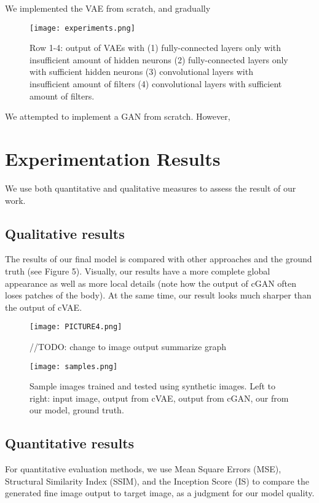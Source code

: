 \documentclass[10pt,conference]{IEEEtran}
\begin{document}
We implemented the VAE from scratch, and gradually 

\begin{figure}[htbp]
\centering
\texttt{[image: experiments.png]}
\caption{Row 1-4: output of VAEs with (1) fully-connected layers only with insufficient amount of  hidden neurons (2) fully-connected layers only with sufficient hidden neurons (3) convolutional layers with insufficient amount of filters (4) convolutional layers with sufficient amount of filters. }
\end{figure}

We attempted to implement a GAN from scratch. However, 

\section{Experimentation Results}

We use both quantitative and qualitative measures to assess the result of our work.

\subsection{Qualitative results}

The results of our final model is compared with other approaches and the ground truth (see Figure 5). Visually, our results have a more complete global appearance as well as more local details (note how the output of cGAN often loses patches of the body). At the same time, our result looks much sharper than the output of cVAE.

\begin{figure}[htbp]
\centering
\texttt{[image: PICTURE4.png]}
\caption{//TODO: change to image output summarize graph}
\end{figure}

\begin{figure}[htbp]
\centering
\texttt{[image: samples.png]}
\caption{Sample images trained and tested using synthetic images. Left to right: input image, output from cVAE, output from cGAN, our from our model, ground truth.}
\end{figure}

\subsection{Quantitative results}

For quantitative evaluation methods, we use Mean Square Errors (MSE), Structural Similarity Index (SSIM), and the Inception Score (IS) to compare the generated fine image output to target image, as a judgment for our model quality.
\end{document}
